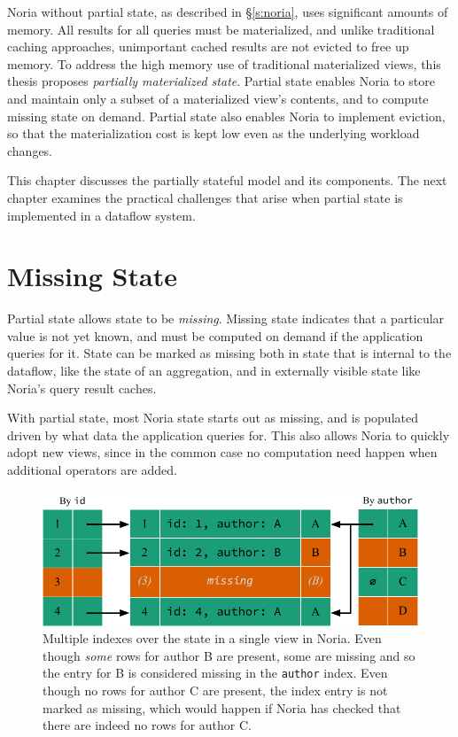 Noria without partial state, as described in \S\ref{s:noria}, uses significant
amounts of memory. All results for all queries must be materialized, and unlike
traditional caching approaches, unimportant cached results are not evicted to
free up memory. To address the high memory use of traditional materialized
views, this thesis proposes \textit{partially materialized state}. Partial state
enables Noria to store and maintain only a subset of a materialized view's
contents, and to compute missing state on demand. Partial state also enables
Noria to implement eviction, so that the materialization cost is kept low even
as the underlying workload changes.

This chapter discusses the partially stateful model and its components. The next
chapter examines the practical challenges that arise when partial state is
implemented in a dataflow system.

\section{Missing State}

Partial state allows state to be \textit{missing}. Missing state indicates that
a particular value is not yet known, and must be computed on demand if the
application queries for it. State can be marked as missing both in state that is
internal to the dataflow, like the state of an aggregation, and in externally
visible state like Noria's query result caches.

With partial state, most Noria state starts out as missing, and is populated
driven by what data the application queries for. This also allows Noria to
quickly adopt new views, since in the common case no computation need happen
when additional operators are added.

\begin{figure}
  \centering
  \includegraphics{diagrams/Indexing.pdf}
  \caption{Multiple indexes over the state in a single view in Noria. Even
  though \emph{some} rows for author B are present, some are missing and so the
  entry for B is considered missing in the \texttt{author} index. Even though no
  rows for author C are present, the index entry is not marked as missing, which
  would happen if Noria has checked that there are indeed no rows for
  author C.}
  \label{f:indexing}
\end{figure}

